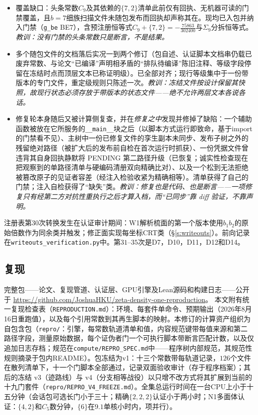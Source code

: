 \documentclass[11pt]{article}
\numberwithin{equation}{section}
\theoremstyle{definition}
\theoremstyle{remark}
\begin{document}
\begin{itemize}
\item[D31.] 覆盖缺口：头条常数$C_9$及其依赖的$\{7,2\}$清单此前仅有回执、无机器可读的门禁覆盖，且$b=7$细族扫描文件未随包发布而回执却声称其在。现均已入包并纳入门禁（\texttt{g\_be} BE7），含预注册恒等式$C_9+\{7,2\}=-\tfrac{75863}{302400}$与$\Sigma_9$分拆恒等式。\emph{教训：没有门禁的头条常数只是断言，不是结果。}
\item[D32.] 多个随包文件的文档落后实况一到两个修订（包自述、认证脚本文档串仍载已废弃常数、与论文``已编译''声明相矛盾的``排队待编译''陈旧注释、等级字段停留在冻结时点而顶层文本已称证明级）。已全部对齐；现行等级集中于一份带版本的专门文件，重定级规则只陈述一次。\emph{教训：冻结文件按设计保留其快照，故现行状态必须存放于带版本的状态文件——绝不允许两层文本各说各话。}
\item[D33.] 修复轮本身随后又被计算侧复查，并在\emph{修复之中}发现并修掉了缺陷：一个辅助函数被放在它所服务的\texttt{\_\_main\_\_}块之后（以脚本方式运行即致命，基于import的门禁看不见）、主树中一份已修复文件的孪生副本未同步、发布子树之外的残留绝对路径（被扩大后的发布前自检在首次运行时抓获）、一份凭据文件曾违背其自身回执静默将 PENDING 第二路径升级（已恢复；诚实性检查现在把观察到的单路径清单与硬编码清册双向精确比对）、以及一个松到无法拒绝被篡改原子的见证者容差（经注入检验收紧为精确相等）。清单获得了自己的门禁；注入自检获得了``缺失''类。\emph{教训：修复也是代码、也是断言——一项修复只有经第二方对抗性重执行之后才算入档，而``已同步''靠 diff 验证，不靠声明。}
\end{itemize}

\noindent 注册表第$30$次转换发生在认证审计期间：W1解析梳面的第一个版本使用$b_1b_2$的原始倍数作为同余类并触发；修正面实现每坐标CRT类（\S\ref{s:writeouts}）。前向记录在\texttt{writeouts\_verification.py}中。第$31$--$35$次是D7，D10，D11，D12和D14。

\subsection*{复现}

完整包——论文、复现管道、认证层、GPU引擎及Lean源码和构建日志——公开于
\url{https://github.com/JoshuaHKU/zeta-density-one-reproduction}。
本文附有统一复现检查表（\texttt{REPRODUCTION.md}）：环境、每套件单命令、预期输出（2026年8月16日重跑值），以及每个引用常数到其再生脚本的映射。本修订的计算资产组织为自包含包（\texttt{repro/}：引擎，每常数轨道清单和值，内容规范键带每值来源和第二路径字段，测量原始数据，每个证伪者门一个可执行脚本带断言匹配计数，以及仅追加日志存档；规范在\texttt{compute/REPRO\_SPEC.md}中——程序树内部规范，其规范性规则摘录于包内README）。包冻结为v1：十三个常数带每轨道记录，$126$个文件在散列清单下，十一个门脚本全部通过，记录双面验收审计（存于程序档案）；其后的冻结 v3（迹路线）与 v4（分支相等战役）以只增不改方式将其扩展到当前的十九门套件（\texttt{repro/REPRO\_V4\_FREEZE.md}）。全集总运行时间在一台CPU上小于十五分钟（会话包可选长门小于三十；精确$\{2,2,2\}$认证小于两小时；N1多面体认证：$\{4,2\}$和$C_5$数分钟，$\{6\}$在$9.1$单核小时内，项并行）。
\end{document}
